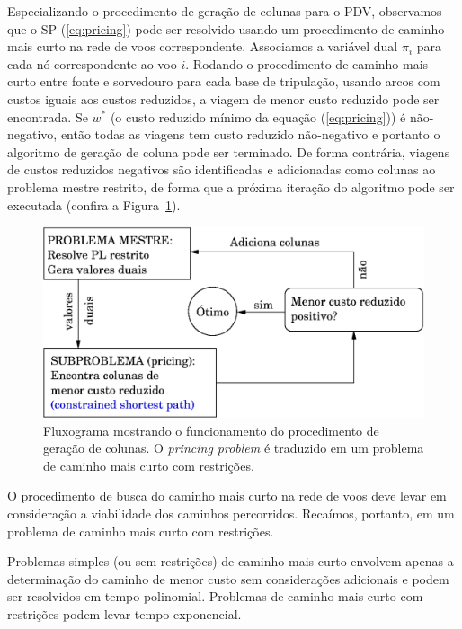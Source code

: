 Especializando o procedimento de geração de colunas para o PDV, observamos que o SP
(\ref{eq:pricing}) pode ser resolvido usando um procedimento de caminho mais curto na rede de voos
correspondente. Associamos a variável dual $\pi_i$ para cada nó correspondente ao voo $i$. Rodando o
procedimento de caminho mais curto entre fonte e sorvedouro para cada base de tripulação, usando
arcos com custos iguais aos custos reduzidos, a viagem de menor custo reduzido pode ser encontrada.
Se $w^\ast$ (o custo reduzido mínimo da equação (\ref{eq:pricing})) é não-negativo, então todas as
viagens tem custo reduzido não-negativo e portanto o algoritmo de geração de coluna pode ser
terminado. De forma contrária, viagens de custos reduzidos negativos são identificadas e adicionadas
como colunas ao problema mestre restrito, de forma que a próxima iteração do algoritmo pode ser
executada (confira a Figura~\ref{fig:cg}).

\begin{figure}[htbp]
	\begin{center}
		\includegraphics[scale=0.6]{fig/cg.eps}
		\caption{Fluxograma mostrando o funcionamento do procedimento de geração de colunas.
		O {\it princing problem} é traduzido em um problema de caminho mais curto com restrições.}
		\label{fig:cg}
	\end{center}
\end{figure}

O procedimento de busca do caminho mais curto na rede de voos deve levar em consideração a 
viabilidade dos caminhos percorridos. Recaímos, portanto, em um problema de caminho mais curto
com restrições.

Problemas simples (ou sem restrições) de caminho mais curto envolvem apenas a determinação do 
caminho de menor custo sem considerações adicionais e podem ser resolvidos em tempo polinomial. 
Problemas de caminho mais curto com restrições podem levar tempo exponencial.

